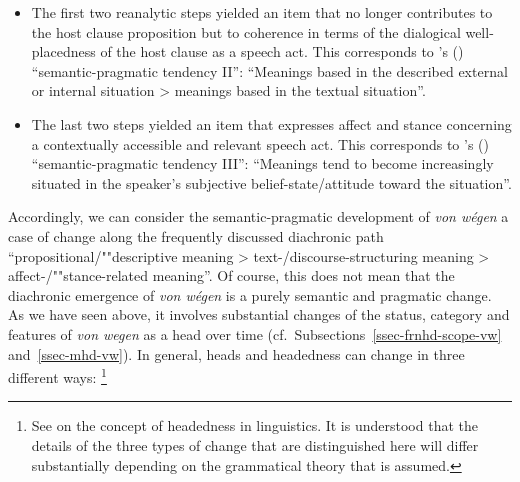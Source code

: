 \documentclass[output=paper
  ,nobabel
  ,draftmode
  ,babelshorthands
  ,colorlinks, citecolor=brown
]{langscibook}
\begin{document}
\begin{itemize}
    \item The first two reanalytic steps yielded an item that no longer contributes to the host clause proposition but to coherence in terms of the dialogical well-placedness of the host clause as a speech act. This corresponds to \citeauthor{TraugottKoenig1991}'s (\citeyear[208]{TraugottKoenig1991}) ``semantic-pragmatic tendency II'': ``Meanings based in the described external or internal situation > meanings based in the textual situation''.
    
    \item The last two steps yielded an item that expresses affect and stance concerning a contextually accessible and relevant speech act. This corresponds to \citeauthor{TraugottKoenig1991}'s (\citeyear[209]{TraugottKoenig1991}) ``semantic-pragmatic tendency III'': ``Meanings tend to become increasingly situated in the speaker’s subjective belief-state/attitude toward the situation''.
\end{itemize}

\noindent
Accordingly, we can consider the semantic-pragmatic development of \emph{von wégen} a case of change
along the frequently discussed diachronic path ``propositional/""descriptive meaning >
text-/discourse\hyp structuring meaning > affect-/""stance\hyp related meaning''. Of course, this does not mean that the diachronic emergence of \emph{von wégen} is a purely semantic and pragmatic change. As we have seen above, it involves substantial changes of the status, category and features of \emph{von wegen} as a head over time (cf.\ Subsections~\ref{ssec-frnhd-scope-vw} and~\ref{ssec-mhd-vw}). In general, heads and headedness can change in three different ways:%
\footnote{See \citet{Zwicky:1985:heads,Zwicky1993,Hudson1987,Croft1996} on the concept of headedness in linguistics. It is understood that the details of the three types of change that are distinguished here will differ substantially depending on the grammatical theory that is assumed.}
\end{document}
